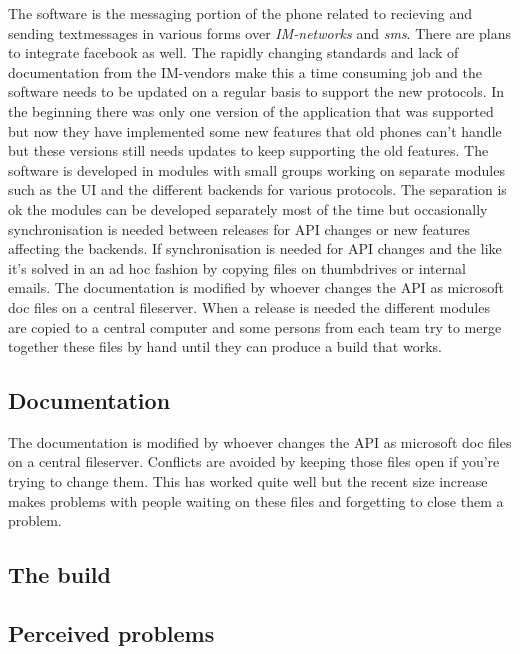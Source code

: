 \documentclass[a4paper,11pt]{article}
\begin{document}
The software is the messaging portion of the phone related to recieving and sending textmessages in various forms over \emph{IM-networks} and  \emph{sms}. There are plans to integrate facebook as well.
The rapidly changing standards and lack of documentation from the IM-vendors make this a time consuming job and the software needs to be updated on a regular basis to support the new protocols.
In the beginning there was only one version of the application that was supported but now they have implemented some new features that old phones can't handle but these versions still needs updates to keep supporting the old features.
The software is developed in modules with small groups working on separate modules such as the UI and the different backends for various protocols.
The separation is ok the modules can be developed separately most of the time but occasionally synchronisation is needed between releases for API changes or new features affecting the backends.
If synchronisation is needed for API changes and the like it's solved in an ad hoc fashion by copying files on thumbdrives or internal emails.
The documentation is modified by whoever changes the API as microsoft doc files on a central fileserver.
When a release is needed the different modules are copied to a central computer and some persons from each team try to merge together these files by hand until they can produce a build that works.

\subsection{Documentation}
The documentation is modified by whoever changes the API as microsoft doc files on a central fileserver.
Conflicts are avoided by keeping those files open if you're trying to change them.
This has worked quite well but the recent size increase makes problems with people waiting on these files and forgetting to close them a problem.

\subsection{The build}


\subsection{Perceived problems}
\end{document}
